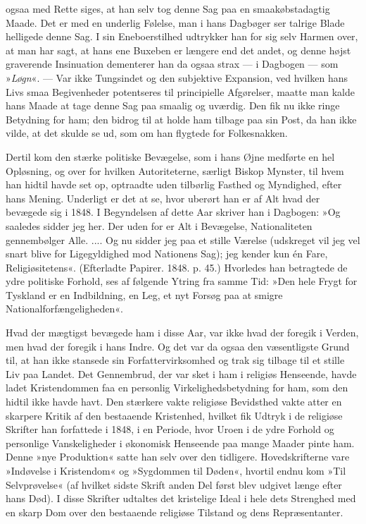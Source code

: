\documentclass[12pt,a4paper,openany]{book}
\newcommand{\opage}[1]{\marginnote{\footnotesize\textit{[#1]}}}
\begin{document}
ogsaa med Rette siges, at han selv tog denne Sag
paa en smaakøbstadagtig Maade. Det er med en underlig
Følelse, man i hans Dagbøger ser talrige Blade helligede
denne Sag. I sin Eneboerstilhed udtrykker han for sig
selv Harmen over, at man har sagt, at hans ene Buxeben
er længere end det andet, og denne højst graverende
Insinuation dementerer han da ogsaa strax --- i Dagbogen
--- som »\textit{Løgn}«. --- Var ikke Tungsindet og den
subjektive Expansion, ved hvilken hans Livs smaa Begivenheder
potentseres til principielle Afgørelser, maatte
man kalde hans Maade at tage denne Sag paa smaalig
og uværdig. Den fik nu ikke ringe Betydning for ham;
den bidrog til at holde ham tilbage paa sin Post, da han
ikke vilde, at det skulde se ud, som om han flygtede for
Folkesnakken.

Dertil kom den stærke politiske Bevægelse, som i
hans Øjne medførte en hel Opløsning, og over for hvilken
Autoriteterne, særligt Biskop Mynster, til hvem han hidtil
havde set op, optraadte uden tilbørlig Fasthed og Myndighed,
efter hans Mening. Underligt er det at se, hvor
uberørt han er af Alt hvad der bevægede sig i 1848. I
Begyndelsen af dette Aar skriver han i Dagbogen: »Og
saaledes sidder jeg her. Der uden for er Alt i Bevægelse,
Nationaliteten gennembølger Alle. .... Og nu sidder
jeg paa et stille Værelse (udskreget vil jeg vel snart
blive for Ligegyldighed mod Nationens Sag); jeg kender
kun én Fare, Religiøsitetens«. (Efterladte Papirer. 1848.
p. 45.) Hvorledes han betragtede de ydre politiske Forhold,
ses af følgende Ytring fra samme Tid: »Den hele
\opage{132}Frygt for Tyskland er en Indbildning, en Leg, et nyt
Forsøg paa at smigre Nationalforfængeligheden«.

Hvad der mægtigst bevægede ham i disse Aar, var
ikke hvad der foregik i Verden, men hvad der foregik i
hans Indre. Og det var da ogsaa den væsentligste Grund
til, at han ikke stansede sin Forfattervirksomhed og trak
sig tilbage til et stille Liv paa Landet. Det Gennembrud,
der var sket i ham i religiøs Henseende, havde
ladet Kristendommen faa en personlig Virkelighedsbetydning
for ham, som den hidtil ikke havde havt. Den
stærkere vakte religiøse Bevidsthed vakte atter en skarpere
Kritik af den bestaaende Kristenhed, hvilket fik
Udtryk i de religiøse Skrifter han forfattede i 1848, i
en Periode, hvor Uroen i de ydre Forhold og personlige
Vanskeligheder i økonomisk Henseende paa mange Maader
pinte ham. Denne »nye Produktion« satte han selv over
den tidligere. Hovedskrifterne vare »Indøvelse i Kristendom«
og »Sygdommen til Døden«, hvortil endnu kom »Til
Selvprøvelse« (af hvilket sidste Skrift anden Del først
blev udgivet længe efter hans Død). I disse Skrifter udtaltes
det kristelige Ideal i hele dets Strenghed med en
skarp Dom over den bestaaende religiøse Tilstand og dens
Repræsentanter.
\end{document}
